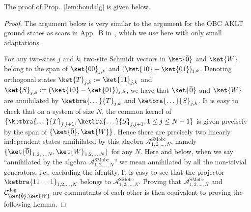 \documentclass[prx,letterpaper,aps,superscriptaddress,floatfix,twocolumn,nofootinbib]{revtex4-2}
\theoremstyle{definition}
\newcommand{\mA}{\mathcal{A}}
\newcommand{\defn}{:=}
\newcommand{\ktO}{\ket{\overline{0}}}
\newcommand{\ktW}{\ket{W}}
\begin{document}
%
The proof of Prop.~\ref{lem:bondalg} is given below. 
%
\begin{proof}
%
The argument below is very similar to the argument for the OBC AKLT ground states as scars in App.~B in~\cite{moudgalya2023exhaustive}, which we use here with only small adaptations.
%

%
For any two-sites $j$ and $k$, two-site Schmidt vectors in $\ktO$ and $\ktW$ belong to the span of $\ket{00}_{j,k}$ and $(\ket{10} + \ket{01})_{j,k}$.
%
Denoting orthogonal states $\ket{T}_{j,k} \defn \ket{11}_{j,k}$ and $\ket{S}_{j,k} \defn (\ket{10} - \ket{01})_{j,k}$, we have that $\ktO$ and $\ktW$ are annihilated by $\ketbra{\dots}{T}_{j,k}$ and $\ketbra{\dots}{S}_{j,k}$.
%
It is easy to check that on a system of size $N$, the common kernel of $\{ \ketbra{\dots}{T}_{j,j+1}, \ketbra{\dots}{S}_{j,j+1}, 1 \leq j \leq N-1 \}$ is given precisely by the span of $\{ \ktO, \ktW \}$.
%
Hence there are precisely two linearly independent states annihilated by this algebra $\mA_{1,2,\dots,N}^\text{SMobc}$, namely $\{ \ktO_{1,2,\dots,N}, \ktW_{1,2,\dots,N} \}$ for any $N$.
%
Here and below, when we say ``annihilated by the algebra $\mA_{1,2,\dots,N}^\text{SMobc}$'' we mean annihilated by all the non-trivial generators, i.e., excluding the identity.
%
It is easy to see that the projector $\ketbra{11 \cdots 1}_{1,2,\dots,N}$ belongs to $\mA_{1,2,\dots,N}^\text{SMobc}$.
%
Proving that $\mA_{1,2,\dots,N}^\text{SMobc}$ and $\mathcal{C}^{\rm deg}_{\ket{\bar{0}},\ket{W}}$ are commutants of each other is then equivalent to proving the following Lemma.
%


\end{proof}
\end{document}
